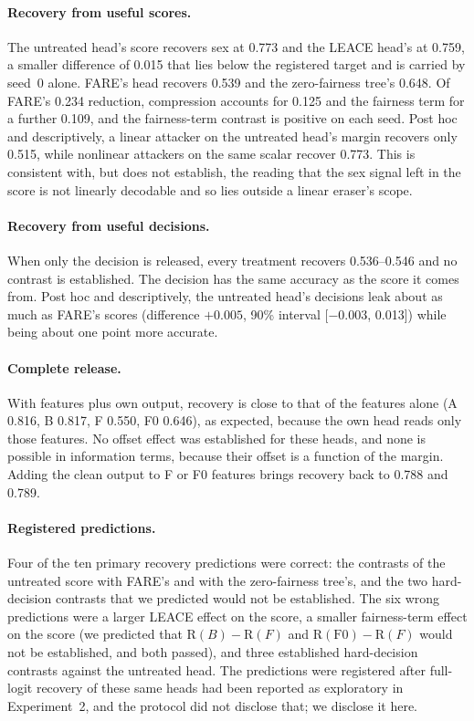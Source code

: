 \documentclass[10pt]{article}
\newcommand{\Rec}{\mathrm{R}}
\begin{document}
\paragraph{Recovery from useful scores.} The untreated head's score recovers sex at 0.773 and the LEACE head's at 0.759,
a smaller difference of 0.015 that lies below the registered target and is carried by seed~0 alone. FARE's head
recovers 0.539 and the zero-fairness tree's 0.648. Of FARE's 0.234 reduction, compression accounts for 0.125 and the
fairness term for a further 0.109, and the fairness-term contrast is positive on each seed. Post hoc and descriptively, a linear attacker on the untreated head's
margin recovers only 0.515, while nonlinear attackers on the same scalar recover 0.773. This is consistent with, but does
not establish, the reading that the sex signal left in the score is not linearly decodable and so lies outside a linear
eraser's scope.

\paragraph{Recovery from useful decisions.} When only the decision is released, every treatment recovers 0.536--0.546
and no contrast is established. The decision has the same accuracy as the score it comes from. Post hoc and
descriptively, the untreated head's decisions leak about as much as FARE's scores (difference $+0.005$, 90\% interval
[$-0.003$, 0.013]) while being about one point more accurate.

\paragraph{Complete release.} With features plus own output, recovery is close to that of the features alone (A 0.816, B 0.817,
F 0.550, F0 0.646), as expected, because the own head reads only those features. No offset effect was established for these heads, and none is possible in information terms, because their
offset is a function of the margin. Adding the clean output to F or F0 features brings recovery back to 0.788 and 0.789.

\paragraph{Registered predictions.} Four of the ten primary recovery predictions were correct: the contrasts of the
untreated score with FARE's and with the zero-fairness tree's, and the two hard-decision contrasts that we predicted
would not be established. The six wrong predictions were a larger LEACE effect on the score, a smaller fairness-term
effect on the score (we predicted that $\Rec(B)-\Rec(F)$ and $\Rec(\mathrm{F0})-\Rec(F)$ would not be established, and
both passed), and three established hard-decision contrasts against the untreated head. The predictions were
registered after full-logit recovery of these same heads had been reported as exploratory in Experiment~2, and the
protocol did not disclose that; we disclose it here.
\end{document}
